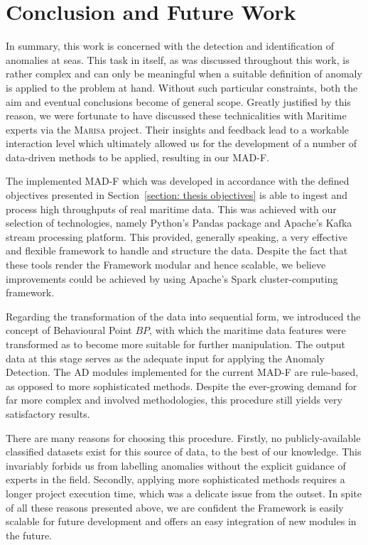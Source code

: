 \chapter{Conclusion and Future Work}
\label{chapter:Chapter6}

In summary, this work is concerned with the detection and identification of anomalies at seas. This task in itself, as was discussed throughout this work, is rather complex and can only be meaningful when a suitable definition of anomaly is applied to the problem at hand. Without such particular constraints, both the aim and eventual conclusions become of general scope. Greatly justified by this reason, we were fortunate to have discussed these technicalities with Maritime experts via the \textsc{Marisa} project. Their insights and feedback lead to a workable interaction level which ultimately allowed us for the development of a number of data-driven methods to be applied, 
resulting in our MAD-F. 

The implemented MAD-F which was developed in accordance with the defined objectives presented in Section~\ref{section: thesis objectives} is able to ingest and process high throughputs of real maritime data. This was achieved with our selection of technologies, namely Python's Pandas package and Apache's Kafka stream processing platform. This provided, generally speaking, a very effective and flexible framework to handle and structure the data. Despite the fact that these tools render the Framework modular and hence scalable, we believe improvements could be achieved by using Apache's Spark cluster-computing framework.

Regarding the transformation of the data into sequential form, we introduced the concept of Behavioural Point $BP$, with which the maritime data features were transformed as to become more suitable for further manipulation. The output data at this stage serves as the adequate input for applying the Anomaly Detection.
The AD modules implemented for the current MAD-F are rule-based, as opposed to more sophisticated methods. Despite the ever-growing demand for far more complex and involved methodologies, this procedure still yields very satisfactory results. 

There are many reasons for choosing this procedure. Firstly, no publicly-available classified datasets exist for this source of data, to the best of our knowledge. This invariably forbids us from labelling anomalies without the explicit guidance of experts in the field. Secondly, applying more sophisticated methods requires a longer project execution time, which was a delicate issue from the outset. 
In spite of all these reasons presented above, we are confident the Framework is easily scalable for future development and offers an easy integration of new modules in the future. 

